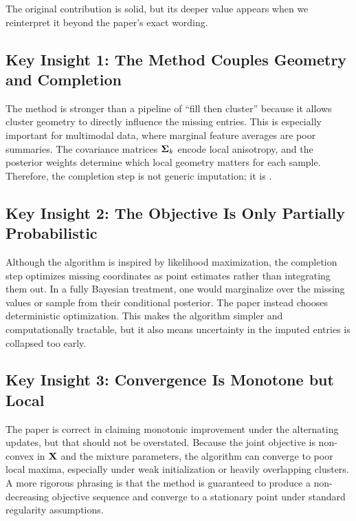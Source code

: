 The original contribution is solid, but its deeper value appears when we reinterpret it beyond the paper's exact wording.

\subsection{Key Insight 1: The Method Couples Geometry and Completion}
The method is stronger than a pipeline of ``fill then cluster'' because it allows cluster geometry to directly influence the missing entries. This is especially important for multimodal data, where marginal feature averages are poor summaries. The covariance matrices $\mathbf{\Sigma}_k$ encode local anisotropy, and the posterior weights determine which local geometry matters for each sample. Therefore, the completion step is not generic imputation; it is .

\subsection{Key Insight 2: The Objective Is Only Partially Probabilistic}
Although the algorithm is inspired by likelihood maximization, the completion step optimizes missing coordinates as point estimates rather than integrating them out. In a fully Bayesian treatment, one would marginalize over the missing values or sample from their conditional posterior. The paper instead chooses deterministic optimization. This makes the algorithm simpler and computationally tractable, but it also means uncertainty in the imputed entries is collapsed too early.

\subsection{Key Insight 3: Convergence Is Monotone but Local}
The paper is correct in claiming monotonic improvement under the alternating updates, but that should not be overstated. Because the joint objective is non-convex in $\mathbf{X}$ and the mixture parameters, the algorithm can converge to poor local maxima, especially under weak initialization or heavily overlapping clusters. A more rigorous phrasing is that the method is guaranteed to produce a non-decreasing objective sequence and converge to a stationary point under standard regularity assumptions.

